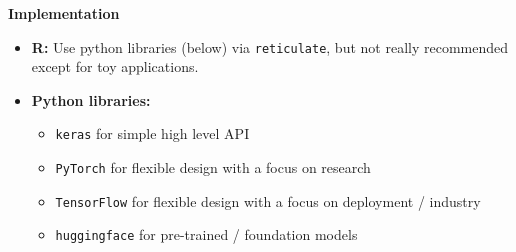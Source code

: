 \documentclass[11pt,compress,t,notes=noshow, xcolor=table]{beamer}
\newcommand{\highlight}[1]{\textcolor{hlcol}{\textbf{#1}}}
\begin{document}
\begin{vbframe}
% 
% 
% 
% 
% 

\medskip
 
\highlight{Implementation}

\begin{itemize}
  \item \textbf{R:} Use python libraries (below) via \texttt{reticulate}, but not really recommended except for toy applications.
  \item \textbf{Python libraries:} 
  \begin{itemize}
      \item \texttt{keras} for simple high level API 
      \item \texttt{PyTorch} for flexible design with a focus on research
      \item \texttt{TensorFlow} for flexible design with a focus on deployment / industry
      \item \texttt{huggingface} for pre-trained / foundation models
  \end{itemize}
\end{itemize}
\end{vbframe}
\end{document}
